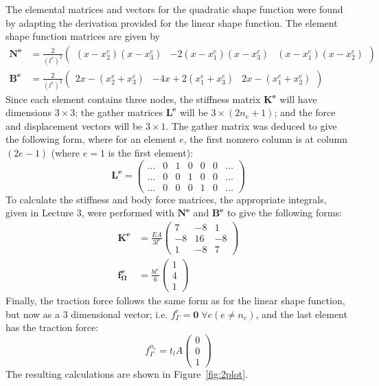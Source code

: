 The elemental matrices and vectors for the quadratic shape function were found
by adapting the derivation provided for the linear shape function. The element
shape function matrices are given by
\begin{align}
    \bm{N^e} &= \frac{2}{(l^e)^2} \begin{pmatrix}
        (x-x_2^e)(x-x_3^e) & -2(x-x_1^e)(x-x_3^e) & (x-x_1^e)(x-x_2^e)
    \end{pmatrix} \\
    \bm{B^e} &= \frac{2}{(l^e)^2} \begin{pmatrix}
        2x-(x_2^e+x_3^e) & -4x+2(x_1^e+x_3^e) & 2x-(x_1^e+x_2^e)
    \end{pmatrix}
\end{align}
Since each element contains three nodes, the stiffness matrix $\bm{K^e}$ will
have dimensions $3\times3$; the gather matrices $\bm{L^e}$ will be
$3\times(2n_e+1)$; and the force and displacement vectors will be $3\times1$.
The gather matrix was deduced to give the following form, where for an element
$e$, the first nonzero column is at column $(2e-1)$ (where $e=1$ is the first
element):
\begin{equation}
    \bm{L^e} = 
    \begin{pmatrix}
        \ldots & 0 & 1 & 0 & 0 & 0 & \ldots \\
        \ldots & 0 & 0 & 1 & 0 & 0 & \ldots \\
        \ldots & 0 & 0 & 0 & 1 & 0 & \ldots
    \end{pmatrix}
\end{equation}
To calculate the stiffness and body force matrices, the appropriate integrals,
given in Lecture 3, were performed with $\bm{N^e}$ and $\bm{B^e}$ to give the
following forms:
\begin{align}
    \bm{K^e} &= \frac{EA}{3l^e}
    \begin{pmatrix}
        7 & -8 & 1 \\
        -8 & 16 & -8 \\
        1 & -8 & 7
    \end{pmatrix} \\
    \bm{f^e_\Omega} &= \frac{bl^e}{6} \begin{pmatrix} 1 \\ 4 \\ 1 \end{pmatrix}
\end{align}
Finally, the traction force follows the same form as for the linear shape
function, but now as a 3 dimensional vector; i.e. $f_\Gamma^e = \bm{0}\;\forall
e(e\neq n_e)$, and the last element has the traction force:
\begin{equation}
    f_\Gamma^{n_e} = t_l A \begin{pmatrix} 0 \\ 0 \\ 1 \end{pmatrix}
\end{equation}
The resulting calculations are shown in Figure~\ref{fig:2plot}.

